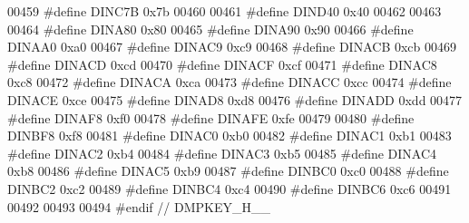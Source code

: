 \begin{DoxyCode}
00459 \textcolor{preprocessor}{#define DINC7B 0x7b}
00460 
00461 \textcolor{preprocessor}{#define DIND40 0x40}
00462 
00463 
00464 \textcolor{preprocessor}{#define DINA80 0x80}
00465 \textcolor{preprocessor}{#define DINA90 0x90}
00466 \textcolor{preprocessor}{#define DINAA0 0xa0}
00467 \textcolor{preprocessor}{#define DINAC9 0xc9}
00468 \textcolor{preprocessor}{#define DINACB 0xcb}
00469 \textcolor{preprocessor}{#define DINACD 0xcd}
00470 \textcolor{preprocessor}{#define DINACF 0xcf}
00471 \textcolor{preprocessor}{#define DINAC8 0xc8}
00472 \textcolor{preprocessor}{#define DINACA 0xca}
00473 \textcolor{preprocessor}{#define DINACC 0xcc}
00474 \textcolor{preprocessor}{#define DINACE 0xce}
00475 \textcolor{preprocessor}{#define DINAD8 0xd8}
00476 \textcolor{preprocessor}{#define DINADD 0xdd}
00477 \textcolor{preprocessor}{#define DINAF8 0xf0}
00478 \textcolor{preprocessor}{#define DINAFE 0xfe}
00479 
00480 \textcolor{preprocessor}{#define DINBF8 0xf8}
00481 \textcolor{preprocessor}{#define DINAC0 0xb0}
00482 \textcolor{preprocessor}{#define DINAC1 0xb1}
00483 \textcolor{preprocessor}{#define DINAC2 0xb4}
00484 \textcolor{preprocessor}{#define DINAC3 0xb5}
00485 \textcolor{preprocessor}{#define DINAC4 0xb8}
00486 \textcolor{preprocessor}{#define DINAC5 0xb9}
00487 \textcolor{preprocessor}{#define DINBC0 0xc0}
00488 \textcolor{preprocessor}{#define DINBC2 0xc2}
00489 \textcolor{preprocessor}{#define DINBC4 0xc4}
00490 \textcolor{preprocessor}{#define DINBC6 0xc6}
00491 
00492 
00493 
00494 \textcolor{preprocessor}{#endif // DMPKEY\_H\_\_}
\end{DoxyCode}
